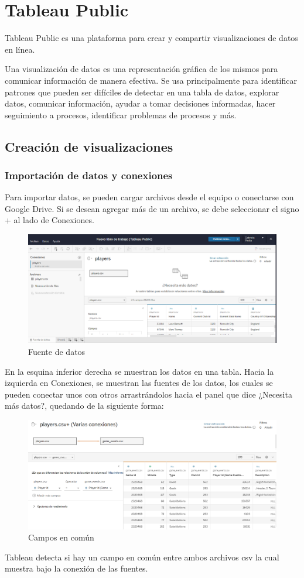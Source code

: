 \documentclass[a4paper, 12pt]{book}
\begin{document}
\chapter{Tableau Public}
Tableau Public es una plataforma para crear y compartir visualizaciones de datos en línea.

Una visualización de datos es una representación gráfica de los mismos para comunicar información de manera efectiva. Se usa principalmente para identificar patrones que pueden ser difíciles de detectar en una tabla de datos, explorar datos, comunicar información, ayudar a tomar decisiones informadas, hacer seguimiento a procesos, identificar problemas de procesos y más.

\section{Creación de visualizaciones}
\subsection{Importación de datos y conexiones}
Para importar datos, se pueden cargar archivos desde el equipo o conectarse con Google Drive. Si se desean agregar más de un archivo, se debe seleccionar el signo + al lado de Conexiones.
\begin{figure}[H] 
	\centering 
	\includegraphics[width=1.0\linewidth]{foto1.png}
	\caption{Fuente de datos}
\end{figure}
En la esquina inferior derecha se muestran los datos en una tabla. Hacia la izquierda en Conexiones, se muestran las fuentes de los datos, los cuales se pueden conectar unos con otros arrastrándolos hacia el panel que dice ¿Necesita más datos?, quedando de la siguiente forma:
\begin{figure}[H] 
	\centering 
	\includegraphics[width=1.0\linewidth]{foto2.png}
	\caption{Campos en común}
\end{figure}
Tableau detecta si hay un campo en común entre ambos archivos csv la cual muestra bajo la conexión de las fuentes.
\end{document}
